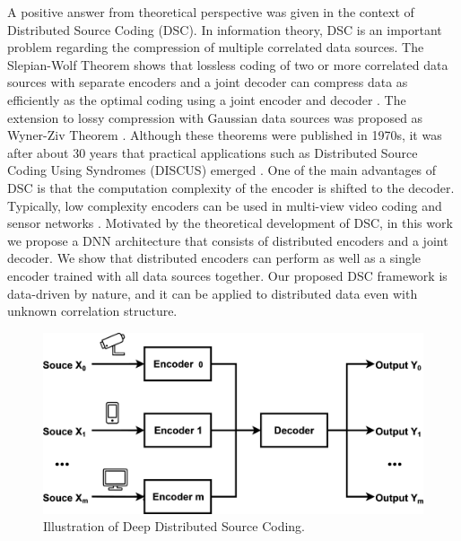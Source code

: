 \documentclass[10pt,twocolumn,letterpaper]{article}
\begin{document}
A positive answer from theoretical perspective was given in the context of Distributed Source Coding (DSC). 
In information theory, DSC is an important problem regarding the compression of multiple correlated data sources. The Slepian-Wolf Theorem shows that lossless coding of two or more correlated data sources with separate encoders and a joint decoder can compress data as efficiently as the optimal coding using a joint encoder and decoder \cite{slepian1973noiseless,cover1975proof}. The extension to lossy compression with Gaussian data sources was proposed as Wyner-Ziv Theorem \cite{wyner1976rate}. Although these theorems were published in 1970s, it was after about 30 years that practical applications such as Distributed Source Coding Using Syndromes (DISCUS) emerged \cite{pradhan2003distributed}. One of the main advantages of DSC is that the computation complexity of the encoder is shifted to the decoder. Typically, low complexity encoders can be used in multi-view video coding and sensor networks \cite{girod2005distributed,xiong2004distributed}. 
Motivated by the theoretical development of DSC, in this work we propose a DNN architecture that consists of distributed encoders and a joint decoder. We show that distributed encoders can perform as well as a single encoder trained with all data sources together.
Our proposed DSC framework is data-driven by nature, and it can be applied to distributed data even with unknown correlation structure.

\begin{figure}
\begin{center}
\includegraphics[width=1\linewidth]{figure/DeepDSC.eps}
\end{center}
   \caption{Illustration of Deep Distributed Source Coding.}
\label{fig_0}
\end{figure}
\end{document}
